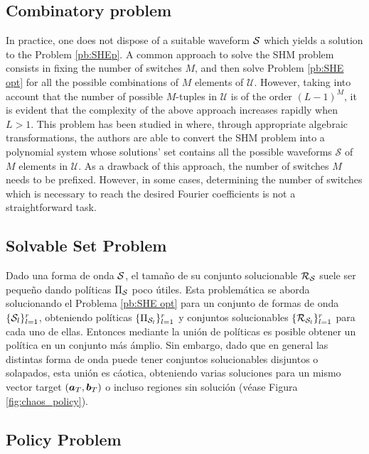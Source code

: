 \documentclass[twocolumn]{autart}    %
\begin{document}
\subsection{Combinatory problem}\label{subsec:Combinatory Problem}
In practice, one does not dispose of a suitable waveform $\mathcal{S}$ which yields a solution to the Problem \ref{pb:SHEp}. A common approach to solve the SHM problem consists in fixing the number of switches $M$, and then solve Problem \ref{pb:SHE opt} for  all the possible combinations of $M$ elements of $\mathcal{U}$. However, taking into account that the number of possible $M$-tuples  in $\mathcal U$ is of the order $(L-1)^M$, it is evident that the complexity of the above approach increases rapidly when $L>1$. This problem has been studied in \cite{Yang2015} where, through appropriate algebraic transformations, the authors are able to convert the SHM problem into a polynomial system whose solutions' set contains all the possible waveforms $\mathcal S$ of $M$ elements in $\mathcal{U}$. As a drawback of this approach, the number of switches $M$ needs to be prefixed. However, in some cases,  determining the number of switches which is necessary to reach the desired Fourier coefficients is not a straightforward task.

\JOStart
\subsection{Solvable Set Problem}\label{subsec: resolvable set probem }

Dado una forma de onda $\mathcal{S}$, el tamaño de su conjunto solucionable $\mathcal{R}_{\mathcal{S}}$ suele ser  pequeño dando políticas $\Pi_{\mathcal{S}}$ poco útiles. Esta problemática se aborda solucionando el Problema \ref{pb:SHE opt} para un conjunto de formas de onda $\{\mathcal{S}_l\}_{l=1}^r$, obteniendo políticas $\{\Pi_{\mathcal{S}_l}\}_{l=1}^r$ y  conjuntos solucionables $\{\mathcal{R}_{\mathcal{S}_l}\}_{l=1}^r$ para cada uno de ellas. Entonces mediante la unión de políticas es posible obtener un política en un conjunto más ámplio. Sin embargo, dado que en general las distintas forma de onda puede tener conjuntos solucionables disjuntos o solapados, esta unión es cáotica, obteniendo varias soluciones para un mismo vector target $(\bm{a}_T,\bm{b}_T)$ o incluso regiones sin solución (véase Figura \ref{fig:chaos_policy}).

\subsection{Policy Problem} \label{subsec:Non-continuous policy}
 
\end{document}
